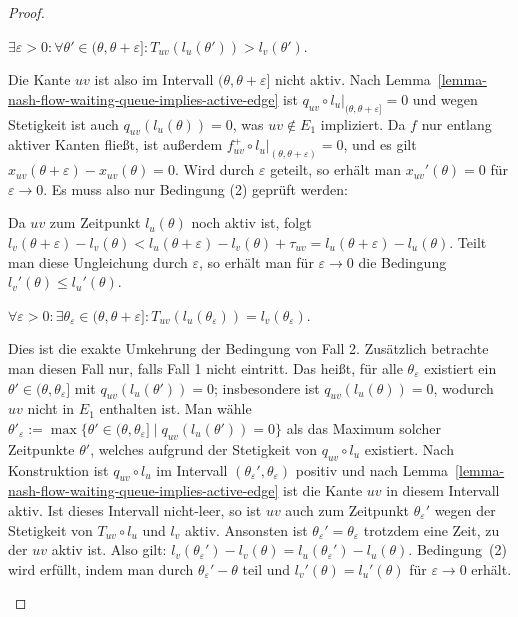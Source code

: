 \begin{proof}
\begin{description}[leftmargin=0cm, topsep=0cm, itemindent=\parindent]
		\item[2. Fall:] $\exists \varepsilon > 0: \forall \theta'\in(\theta, \theta + \varepsilon]: T_{uv}(l_u(\theta'))>l_v(\theta')$.
		
		Die Kante ${uv}$ ist also im Intervall $(\theta, \theta + \varepsilon]$ nicht aktiv.
		Nach Lemma~\ref{lemma-nash-flow-waiting-queue-implies-active-edge} ist $q_{uv} \circ l_u\big|_{(\theta, \theta+\varepsilon]}=0$ und wegen Stetigkeit ist auch $q_{uv}(l_u(\theta))=0$, was $uv\notin E_1$ impliziert.
		Da $f$ nur entlang aktiver Kanten fließt, ist außerdem $f_{uv}^+ \circ l_u \big|_{(\theta, \theta+\varepsilon)} = 0$, und es gilt $x_{uv}(\theta + \varepsilon) - x_{uv}(\theta)=0$.
		Wird durch $\varepsilon$ geteilt, so erhält man $x_{uv}'(\theta) = 0$ für $\varepsilon\rightarrow0$.
		Es muss also nur Bedingung (2) geprüft werden:
		
		
		Da $uv$ zum Zeitpunkt $l_u(\theta)$ noch aktiv ist, folgt $l_v(\theta + \varepsilon) - l_v(\theta) < l_u(\theta+\varepsilon) - l_v(\theta) + \tau_{uv} = l_u(\theta + \varepsilon) - l_u(\theta)$.
		Teilt man diese Ungleichung  durch $\varepsilon$, so erhält man für $\varepsilon\rightarrow 0$ die Bedingung $l_v'(\theta)\leq l_u'(\theta)$.
		
		\item[3. Fall:] $\forall \varepsilon>0: \exists \theta_{\varepsilon}\in (\theta, \theta+\varepsilon]: T_{uv}(l_u(\theta_\varepsilon)) = l_v(\theta_\varepsilon)$.
		
		Dies ist die exakte Umkehrung der Bedingung von Fall 2.
		Zusätzlich betrachte man diesen Fall nur, falls Fall 1 nicht eintritt.
		Das heißt, für alle $\theta_\varepsilon$ existiert ein $\theta'\in(\theta, \theta_\varepsilon]$ mit $q_{uv}(l_u(\theta')) = 0$; insbesondere ist $q_{uv}(l_u(\theta))= 0$, wodurch $uv$ nicht in $E_1$ enthalten ist.
		Man wähle $\theta'_\varepsilon:=\max\{ \theta'\in (\theta, \theta_\varepsilon] \mid q_{uv}(l_u(\theta')) = 0 \}$ als das Maximum solcher Zeitpunkte $\theta'$, welches aufgrund der Stetigkeit von $q_{uv}\circ l_u$ existiert.
		Nach Konstruktion ist $q_{uv}\circ l_u$ im Intervall $(\theta_\varepsilon', \theta_\varepsilon)$ positiv und nach Lemma~\ref{lemma-nash-flow-waiting-queue-implies-active-edge} ist die Kante $uv$ in diesem Intervall aktiv.
		Ist dieses Intervall nicht-leer, so ist $uv$ auch zum Zeitpunkt $\theta_\varepsilon'$ wegen der Stetigkeit von $T_{uv}\circ l_u$ und $l_v$ aktiv.
		Ansonsten ist $\theta_\varepsilon'=\theta_\varepsilon$ trotzdem eine Zeit, zu der $uv$ aktiv ist.
		Also gilt: $l_v(\theta_\varepsilon') - l_v(\theta) = l_u(\theta_\varepsilon') - l_u(\theta)$.
		Bedingung~(2) wird erfüllt, indem man durch $\theta_\varepsilon'-\theta$ teil und $l_v'(\theta) = l_u'(\theta)$ für $\varepsilon\rightarrow0$ erhält.
		

\end{description}
\end{proof}
